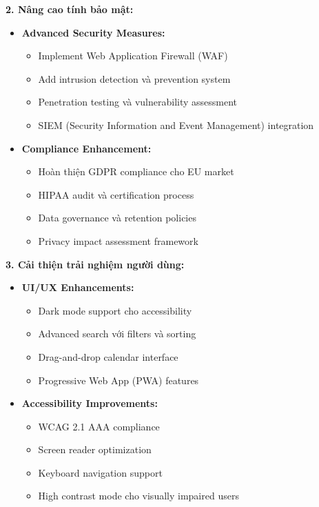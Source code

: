 \documentclass[../DoAn.tex]{subfiles}
\begin{document}
\textbf{2. Nâng cao tính bảo mật:}
\begin{itemize}
    \item \textbf{Advanced Security Measures:}
    \begin{itemize}
        \item Implement Web Application Firewall (WAF)
        \item Add intrusion detection và prevention system
        \item Penetration testing và vulnerability assessment
        \item SIEM (Security Information and Event Management) integration
    \end{itemize}
    
    \item \textbf{Compliance Enhancement:}
    \begin{itemize}
        \item Hoàn thiện GDPR compliance cho EU market
        \item HIPAA audit và certification process
        \item Data governance và retention policies
        \item Privacy impact assessment framework
    \end{itemize}
\end{itemize}

\textbf{3. Cải thiện trải nghiệm người dùng:}
\begin{itemize}
    \item \textbf{UI/UX Enhancements:}
    \begin{itemize}
        \item Dark mode support cho accessibility
        \item Advanced search với filters và sorting
        \item Drag-and-drop calendar interface
        \item Progressive Web App (PWA) features
    \end{itemize}
    
    \item \textbf{Accessibility Improvements:}
    \begin{itemize}
        \item WCAG 2.1 AAA compliance
        \item Screen reader optimization
        \item Keyboard navigation support
        \item High contrast mode cho visually impaired users
    \end{itemize}
\end{itemize}
\end{document}
